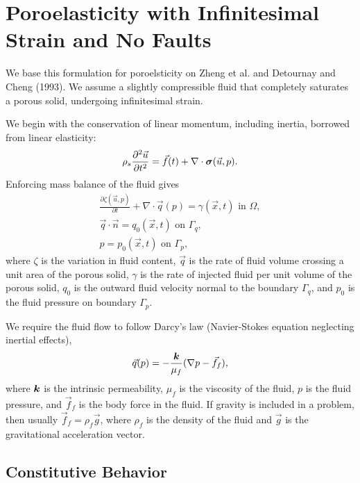 \section{Poroelasticity with Infinitesimal Strain and No Faults}

We base this formulation for poroelsticity on Zheng et al. and
Detournay and Cheng (1993). We assume a slightly compressible fluid
that completely saturates a porous solid, undergoing infinitesimal
strain.

We begin with the conservation of linear momentum, including inertia,
borrowed from linear elasticity:
\begin{equation}
    \rho_s\frac{\partial^2 \vec{u}}{\partial t^2} = \vec{f}(t) + \nabla \cdot \bm{\sigma}(\vec{u},p).
\end{equation}
Enforcing mass balance of the fluid gives
\begin{gather}
  \frac{\partial \zeta(\vec{u},p)}{\partial t} + \nabla \cdot \vec{q}(p) =
  \gamma(\vec{x},t) \text{ in } \Omega, \\
%
  \vec{q} \cdot \vec{n} = q_0(\vec{x},t) \text{ on }\Gamma_q, \\
%
  p = p_0(\vec{x},t) \text{ on }\Gamma_p,
\end{gather}
where $\zeta$ is the variation in fluid content, $\vec{q}$ is the rate
of fluid volume crossing a unit area of the porous solid, $\gamma$ is
the rate of injected fluid per unit volume of the porous solid, $q_0$
is the outward fluid velocity normal to the boundary $\Gamma_q$, and
$p_0$ is the fluid pressure on boundary $\Gamma_p$.

We require the fluid flow to follow Darcy's law (Navier-Stokes
equation neglecting inertial effects),
\begin{equation}
  \vec{q}(p) = -\frac{\bm{k}}{\mu_{f}}(\nabla p - \vec{f}_f),
\end{equation}
where $\bm{k}$ is the intrinsic permeability, $\mu_f$ is the viscosity of the
fluid, $p$ is the fluid pressure, and $\vec{f}_f$ is the body force
in the fluid. If gravity is included in a problem, then usually
$\vec{f}_f = \rho_f \vec{g}$, where $\rho_f$ is the density of the
fluid and $\vec{g}$ is the gravitational acceleration vector.

\subsection{Constitutive Behavior}

